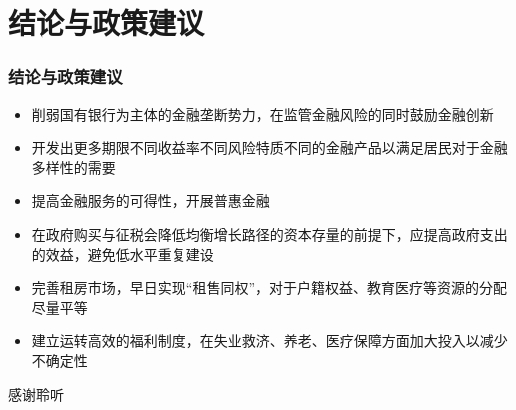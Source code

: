 \documentclass{beamer}
\begin{document}
\section{结论与政策建议}
\begin{frame}
\frametitle{结论与政策建议}
\begin{itemize}
\item 削弱国有银行为主体的金融垄断势力，在监管金融风险的同时鼓励金融创新
\item 开发出更多期限不同收益率不同风险特质不同的金融产品以满足居民对于金融多样性的需要
\item 提高金融服务的可得性，开展普惠金融
\item 在政府购买与征税会降低均衡增长路径的资本存量的前提下，应提高政府支出的效益，避免低水平重复建设
\item 完善租房市场，早日实现“租售同权”，对于户籍权益、教育医疗等资源的分配尽量平等
\item 建立运转高效的福利制度，在失业救济、养老、医疗保障方面加大投入以减少不确定性
\end{itemize}
\end{frame}

\begin{frame}
\Huge{\centerline{感谢聆听}}
\end{frame}
\end{document}
